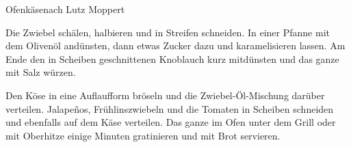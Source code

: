 \begin{recipe}{Ofenkäse}{nach Lutz Moppert}
  \inglist

  \steps

  Die Zwiebel schälen, halbieren und in Streifen schneiden. In einer Pfanne mit
  dem Olivenöl andünsten, dann etwas Zucker dazu und karamelisieren lassen. Am
  Ende den in Scheiben geschnittenen Knoblauch kurz mitdünsten und das ganze
  mit Salz würzen.

  Den Köse in eine Auflaufform bröseln und die Zwiebel-Öl-Mischung darüber
  verteilen. Jalape\~{n}os, Frühlinszwiebeln und die Tomaten in Scheiben
  schneiden und ebenfalls auf dem Käse verteilen. Das ganze im Ofen unter dem
  Grill oder mit Oberhitze einige Minuten gratinieren und mit Brot servieren.

\end{recipe}
